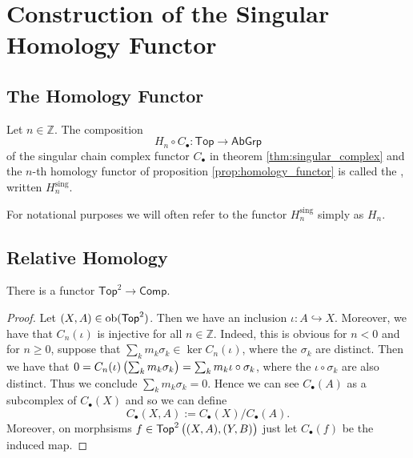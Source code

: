 \section*{Construction of the Singular Homology Functor}





\subsection*{The Homology Functor}
\begin{definition}
	Let $n \in \mathbb{Z}$. The composition 
	\begin{equation}
		H_n \circ C_\bullet : \mathsf{Top} \to \mathsf{AbGrp}
	\end{equation}
	\noindent of the singular chain complex functor $C_\bullet$ in theorem \ref{thm:singular_complex} and the $n$-th homology functor of proposition \ref{prop:homology_functor} is called the , written $H^{\mathrm{sing}}_n$.
\end{definition}

\begin{remark}
	For notational purposes we will often refer to the functor $H_n^{\mathrm{sing}}$ simply as $H_n$.
\end{remark}

\subsection*{Relative Homology}

\begin{proposition}
	There is a functor $\mathsf{Top}^2 \to \mathsf{Comp}$.
\end{proposition}

\begin{proof}
	Let $(X,A) \in \operatorname{ob}(\mathsf{Top}^2)$. Then we have an inclusion $\iota : A \hookrightarrow X$. Moreover, we have that $C_n(\iota)$ is injective for all $n \in \mathbb{Z}$. Indeed, this is obvious for $n < 0$ and for $n \geq 0$, suppose that $\sum_k m_k \sigma_k \in \ker C_n(\iota)$, where the $\sigma_k$ are distinct. Then we have that $0 = C_n(\iota)\del[1]{\sum_k m_k \sigma_k} = \sum_k m_k \iota \circ \sigma_k$, where the $\iota \circ \sigma_k$ are also distinct. Thus we conclude $\sum_k m_k \sigma_k = 0$. Hence we can see $C_\bullet(A)$ as a subcomplex of $C_\bullet(X)$ and so we can define
	\begin{equation*}
		C_\bullet(X,A) := C_\bullet(X)/C_\bullet(A).
	\end{equation*}
	Moreover, on morphsisms $f \in \mathsf{Top}^2\del[1]{(X,A),(Y,B)}$ just let $C_\bullet(f)$ be the induced map.
\end{proof}

